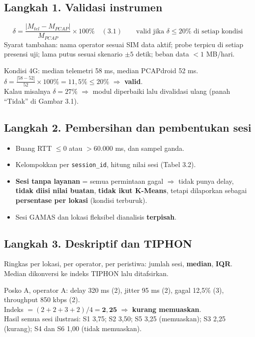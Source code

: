 \subsection*{Langkah 1. Validasi instrumen}
\[\delta=\frac{|M_{tel}-M_{PCAP}|}{M_{PCAP}}\times100\%\quad(3.1)\qquad \text{valid jika } \delta\leq20\% \text{ di setiap kondisi}\]
Syarat tambahan: nama operator sesuai SIM data aktif; probe terpicu di setiap presensi uji; lama putus sesuai skenario $\pm5$ detik; beban data $<1$ MB/hari.
\begin{contoh}[validasi]
Kondisi 4G: median telemetri 58 ms, median PCAPdroid 52 ms. $\delta=\frac{|58-52|}{52}\times100\%=11{,}5\%\leq20\%$ $\Rightarrow$ \textbf{valid}.\\
Kalau misalnya $\delta=27\%$ $\Rightarrow$ modul diperbaiki lalu divalidasi ulang (panah ``Tidak'' di Gambar 3.1).
\end{contoh}

\subsection*{Langkah 2. Pembersihan dan pembentukan sesi}
\begin{itemize}
  \item Buang RTT $\leq 0$ atau $>60.000$ ms, dan sampel ganda.
  \item Kelompokkan per \texttt{session\_id}, hitung nilai sesi (Tabel 3.2).
  \item \textbf{Sesi tanpa layanan} = semua permintaan gagal $\Rightarrow$ tidak punya delay, \textbf{tidak diisi nilai buatan}, \textbf{tidak ikut K-Means}, tetapi dilaporkan sebagai \textbf{persentase per lokasi} (kondisi terburuk).
  \item Sesi GAMAS dan lokasi fleksibel dianalisis \textbf{terpisah}.
\end{itemize}

\subsection*{Langkah 3. Deskriptif dan TIPHON}
Ringkas per lokasi, per operator, per peristiwa: jumlah sesi, \textbf{median}, \textbf{IQR}. Median dikonversi ke indeks TIPHON lalu ditafsirkan.
\begin{contoh}
Posko A, operator A: delay 320 ms (2), jitter 95 ms (2), gagal 12,5\% (3), throughput 850 kbps (2).\\
Indeks $=(2+2+3+2)/4=\mathbf{2{,}25}$ $\Rightarrow$ \textbf{kurang memuaskan}.\\
Hasil semua sesi ilustrasi: S1 3,75; S2 3,50; S5 3,25 (memuaskan); S3 2,25 (kurang); S4 dan S6 1,00 (tidak memuaskan).
\end{contoh}

